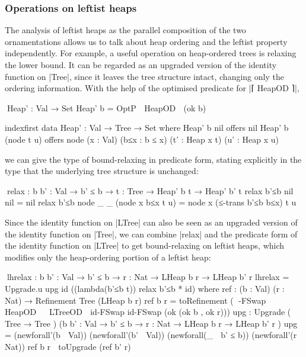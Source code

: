 \subsubsection{Operations on leftist heaps}

The analysis of leftist heaps as the parallel composition of the two ornamentations allows us to talk about heap ordering and the leftist property independently.
For example, a useful operation on heap-ordered trees is relaxing the lower bound.
It can be regarded as an upgraded version of the identity function on |Tree|, since it leaves the tree structure intact, changing only the ordering information.
With the help of the optimised predicate for |⌈ HeapOD ⌉|,
\begin{code}
^^^Heap' : Val → Set
Heap' b = OptP ⌈ HeapOD ⌉ (ok b)

indexfirst data Heap' : Val → Tree → Set where
  Heap' b  nil         offers  nil
  Heap' b  (node t u)  offers  node  (x : Val) (b≤x : b ≤ x)
                                     (t' : Heap x t) (u' : Heap x u)
\end{code}
we can give the type of bound-relaxing in predicate form, stating explicitly in the type that the underlying tree structure is unchanged:
\begin{code}
^^^relax : {b b' : Val} → b' ≤ b → {t : Tree} → Heap' b t → Heap' b' t
relax b'≤b {nil       }  nil               =  nil
relax b'≤b {node _ _  }  (node x b≤x t u)  =  node x (≤-trans b'≤b b≤x) t u
\end{code}
Since the identity function on |LTree| can also be seen as an upgraded version of the identity function on |Tree|, we can combine |relax| and the predicate form of the identity function on |LTree| to get bound-relaxing on leftist heaps, which modifies only the heap-ordering portion of a leftist heap:
\begin{code}
^^^lhrelax : {b b' : Val} → b' ≤ b → {r : Nat} → LHeap b r → LHeap b' r
lhrelax = Upgrade.u upg id ((lambda(b'≤b t)) relax b'≤b * id)
  where
    ref : (b : Val) (r : Nat) → Refinement Tree (LHeap b r)
    ref b r =  toRefinement
                 (  ⊗-FSwap ⌈ HeapOD ⌉ ⌈ LTreeOD ⌉ id-FSwap id-FSwap
                      (ok (ok b , ok r)))
    upg :  Upgrade
             (                                     Tree       → Tree        )
             ({b b' : Val} → b' ≤ b → {r : Nat} →  LHeap b r  → LHeap b' r  )
    upg =   (newforall'(b ∶ Val)) (newforall'(b' ∶ Val)) (newforall(_ ∶ b' ≤ b))
              (newforall'(r ∶ Nat)) ref b r ⇀ toUpgrade (ref b' r)
\end{code}
